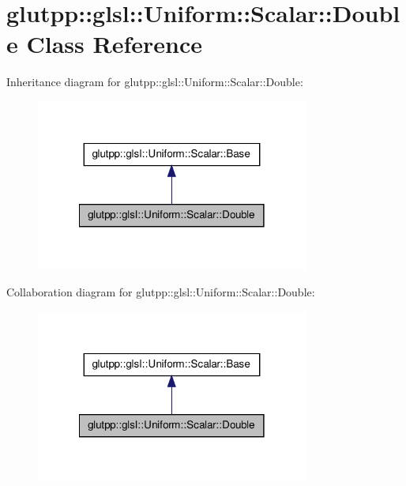 \hypertarget{classglutpp_1_1glsl_1_1Uniform_1_1Scalar_1_1Double}{\section{glutpp\-:\-:glsl\-:\-:\-Uniform\-:\-:\-Scalar\-:\-:\-Double \-Class \-Reference}
\label{classglutpp_1_1glsl_1_1Uniform_1_1Scalar_1_1Double}
}


\-Inheritance diagram for glutpp\-:\-:glsl\-:\-:\-Uniform\-:\-:\-Scalar\-:\-:\-Double\-:\nopagebreak
\begin{figure}[H]
\begin{center}
\leavevmode
\includegraphics[width=254pt]{classglutpp_1_1glsl_1_1Uniform_1_1Scalar_1_1Double__inherit__graph}
\end{center}
\end{figure}


\-Collaboration diagram for glutpp\-:\-:glsl\-:\-:\-Uniform\-:\-:\-Scalar\-:\-:\-Double\-:\nopagebreak
\begin{figure}[H]
\begin{center}
\leavevmode
\includegraphics[width=254pt]{classglutpp_1_1glsl_1_1Uniform_1_1Scalar_1_1Double__coll__graph}
\end{center}
\end{figure}
